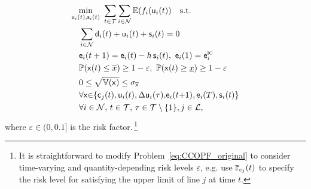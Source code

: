 \documentclass[final,3p,times,twocolumn]{elsarticle}  %
\begin{document}
\begin{subequations} 
	\label{eq:CCOPF_original}
	\begin{align}
	\label{eq:CCOPF_original_cost}
	\underset{\rv{\gen}_i(t), \rv{\storage}_i(t)}{\operatorname{min}}~  & \sum_{t \in \mathcal{\horizon}}\sum_{i \in \mathcal{\nbus}} \ev{ f_i(\rv\gen_i(t)} \quad \mathrm{s.t.}\\
	\label{eq:CCOPF_original_PowerBalance}
	& \hspace{\adjustCCOPF} \sum_{i \in \mathcal{\nbus}} \rv\load_i(t) + \rv\gen_i(t) + \rv\storage_i(t) = 0 \\
	\label{eq:CCOPF_original_StorageDynamics}
	& \hspace{\adjustCCOPF} 	\rv\energy_i(t+1) = \rv\energy_i(t) - h \, \rv\storage_i(t), ~ \rv\energy_i(1) = \rv\energy_i^{\textsc{ic}} \\
	\label{eq:CCOPF_CCs}
	& \hspace{\adjustCCOPF} \prob{ \rv x(t) \leq \overline{x} } \geq 1 - \varepsilon,
	~ \prob{ \rv x (t) \geq \underline{x} } \geq 1 - \varepsilon  \\
	\label{eq:CCOPF_original_StdConstraint}
	& \hspace{\adjustCCOPF} 0 \leq \sqrt{\var{\rv{x}}} \leq \sigma_{\overline{\rv{x}}} \\
	& \hspace{\adjustCCOPF} \forall \rv{x} {\in} \{ \rv\lineflow_j (t), \rv\gen_i(t), 
	\Delta\rv\gen_i(\tau),\! \rv\energy_i(t {+} 1), \rv\energy_i(T), \rv\storage_i(t) \} \\
	\nonumber
	& \hspace{\adjustCCOPF} \forall i \in \mathcal{\nbus}, \, t \in \mathcal{\horizon}, \, \tau \in \mathcal{\horizon} \setminus \{1\}, j \in \mathcal{L},
	\end{align}
\end{subequations}
where $\varepsilon \in (0,0.1]$ is the risk factor.\,\footnote{It is straightforward to modify Problem~\eqref{eq:CCOPF_original} to consider time-varying and quantity-depending risk levels $\varepsilon$, e.g. use $\overline\varepsilon_{c_j}(t)$ to specify the risk level for satisfying the upper limit of line $j$ at time $t$.}
\end{document}
